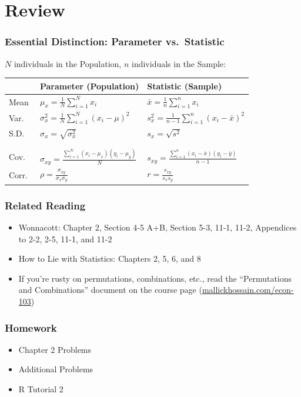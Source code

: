 \documentclass{beamer}
\begin{document}
\section{Review}
\begin{frame}
\frametitle{Essential Distinction: Parameter vs.\ Statistic}
	$N$ individuals in the Population, $n$ individuals in the Sample:
	\vspace{1em}
	\small
	\begin{tabular}{l|l|l}
		&\textbf{Parameter} (Population)&\textbf{Statistic} (Sample)\\
		\hline
		Mean&$\displaystyle\mu_x = \frac{1}{N} \sum_{i = 1}^N x_i$& $\displaystyle\bar{x} = \frac{1}			{n} \sum_{i = 1}^n x_i$ \\
		Var.\ &$\displaystyle \sigma_x^2 = \frac{1}{N}\sum_{i = 1}^N (x_i - \mu)^2$ &$\displaystyle 			s_x^2 = \frac{1}{n - 1}\sum_{i = 1}^n(x_i - \bar{x})^2$\\
		S.D.\ &$\sigma_x = \sqrt{\sigma_x^2}$ &$s_x = \sqrt{s^2}$ \\
		&&\\
		\hline
		&&\\
		\alert{Cov.\ }&\alert{$\displaystyle \sigma_{xy} = \frac{\sum_{i = 1}^N(x_i - \mu_x)(y_i - 				\mu_y)}{N}$} &\alert{$\displaystyle s_{xy} = \frac{\sum_{i = 1}^n(x_i - \bar{x})(y_i - \bar{y})}			{n - 1}$}\\
		\alert{Corr.\ } & \alert{$\displaystyle \rho = \frac{\sigma_{xy}}{\sigma_x \sigma_y}$}& 					\alert{$\displaystyle r = \frac{s_{xy}}{s_x s_y}$}
	\end{tabular}
\end{frame}

\begin{frame}
\frametitle{Related Reading}
	\begin{itemize}
		\item Wonnacott: Chapter 2, Section 4-5 A+B, Section 5-3, 11-1, 11-2, Appendices to 2-2, 2-5, 11-1, and 11-2
		\item How to Lie with Statistics: Chapters 2, 5, 6, and 8
		\item If you're rusty on permutations, combinations, etc., read the ``Permutations and Combinations'' document on the course page (\url{mallickhossain.com/econ-103})
	\end{itemize}
\end{frame}

\begin{frame}
\frametitle{Homework}
	\begin{itemize}
		\item Chapter 2 Problems
		\item Additional Problems
		\item R Tutorial 2
	\end{itemize}
\end{frame}

\end{document}
